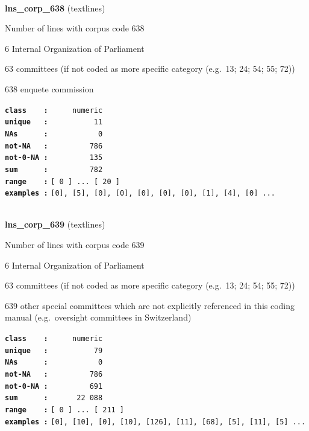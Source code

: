 \documentclass[]{article}
\begin{document}
~

\textbf{lns\_corp\_638} (textlines)

Number of lines with corpus code 638

6 Internal Organization of Parliament

63 committees (if not coded as more specific category (e.g.~13; 24; 54;
55; 72))

638 enquete commission

\textbf{\texttt{class\ \ \ \ :}} \texttt{~~~~~numeric}\\
\textbf{\texttt{unique\ \ \ :}} \texttt{~~~~~~~~~~11}\\
\textbf{\texttt{NAs\ \ \ \ \ \ :}} \texttt{~~~~~~~~~~~0}\\
\textbf{\texttt{not-NA\ \ \ :}} \texttt{~~~~~~~~~786}\\
\textbf{\texttt{not-0-NA\ :}} \texttt{~~~~~~~~~135}\\
\textbf{\texttt{sum\ \ \ \ \ \ :}} \texttt{~~~~~~~~~782}\\
\textbf{\texttt{range\ \ \ \ :}}
\texttt{{[}\ 0\ {]}\ ...\ {[}\ 20\ {]}}\\
\textbf{\texttt{examples\ :}}
\texttt{{[}0{]},\ {[}5{]},\ {[}0{]},\ {[}0{]},\ {[}0{]},\ {[}0{]},\ {[}0{]},\ {[}1{]},\ {[}4{]},\ {[}0{]}\ ...}\\

~

\textbf{lns\_corp\_639} (textlines)

Number of lines with corpus code 639

6 Internal Organization of Parliament

63 committees (if not coded as more specific category (e.g.~13; 24; 54;
55; 72))

639 other special committees which are not explicitly referenced in this
coding manual (e.g.~oversight committees in Switzerland)

\textbf{\texttt{class\ \ \ \ :}} \texttt{~~~~~numeric}\\
\textbf{\texttt{unique\ \ \ :}} \texttt{~~~~~~~~~~79}\\
\textbf{\texttt{NAs\ \ \ \ \ \ :}} \texttt{~~~~~~~~~~~0}\\
\textbf{\texttt{not-NA\ \ \ :}} \texttt{~~~~~~~~~786}\\
\textbf{\texttt{not-0-NA\ :}} \texttt{~~~~~~~~~691}\\
\textbf{\texttt{sum\ \ \ \ \ \ :}} \texttt{~~~~~~22~088}\\
\textbf{\texttt{range\ \ \ \ :}}
\texttt{{[}\ 0\ {]}\ ...\ {[}\ 211\ {]}}\\
\textbf{\texttt{examples\ :}}
\texttt{{[}0{]},\ {[}10{]},\ {[}0{]},\ {[}10{]},\ {[}126{]},\ {[}11{]},\ {[}68{]},\ {[}5{]},\ {[}11{]},\ {[}5{]}\ ...}\\
\end{document}
